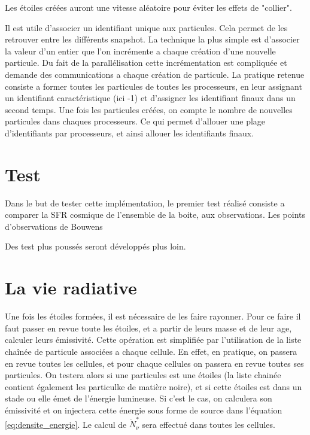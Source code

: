Les étoiles créées auront une vitesse aléatoire pour éviter les effets de "collier".


Il est utile d'associer un identifiant unique aux particules.
Cela permet de les retrouver entre les différents snapshot.
La technique la plus simple est d'associer la valeur d'un entier que l'on incrémente a chaque création d'une nouvelle particule.
Du fait de la parallélisation cette incrémentation est compliquée et demande des communications a chaque création de particule.
La pratique retenue consiste a former toutes les particules de toutes les processeurs, en leur assignant un identifiant caractéristique (ici -1) et d'assigner les identifiant finaux dans un second temps.
Une fois les particules créées,  on compte le nombre de nouvelles particules dans chaques processeurs.
Ce qui permet d'allouer une plage d'identifiants par processeurs, et ainsi allouer les identifiants finaux.


\section{Test}

Dans le but de tester cette implémentation, le premier test réalisé consiste a comparer la SFR cosmique de l'ensemble de la boite, aux observations.
Les points d'observations de Bouwens %


Des test plus poussés seront développés plus loin.



\section{La vie radiative}

Une fois les étoiles formées, il est nécessaire de les faire rayonner.
Pour ce faire il faut passer en revue toute les étoiles, et a partir de leurs masse et de leur age, calculer leurs émissivité.
Cette opération est simplifiée par l'utilisation de la liste chaînée de particule associées a chaque cellule. %
En effet, en pratique, on passera en revue toutes les cellules, et pour chaque cellules on passera en revue toutes ses particules.
On testera alors si une particules est une étoiles (la liste chainée contient également les particulke de matière noire), et si cette étoiles est dans un stade ou elle émet de l'énergie lumineuse.
Si c'est le cas, on calculera son émissivité et on injectera cette énergie sous forme de source dans l'équation \ref{eq:densite_energie}.
Le calcul de $\dot{N}_\nu^*$ sera effectué dans toutes les cellules.

